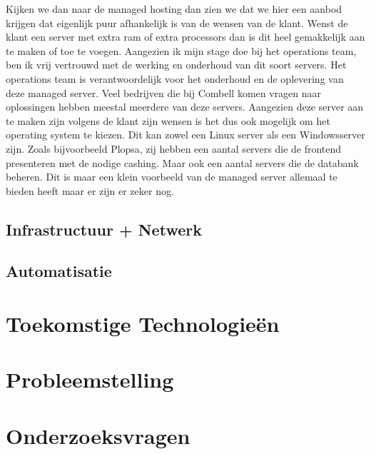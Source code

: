 Kijken we dan naar de managed hosting dan zien we dat we hier een aanbod krijgen dat eigenlijk puur afhankelijk is van de wensen van de klant. Wenst de klant een server met extra ram of extra processors dan is dit heel gemakkelijk aan te maken of toe te voegen. Aangezien ik mijn stage doe bij het operations team, ben ik vrij vertrouwd met de werking en onderhoud van dit soort servers. Het operations team is verantwoordelijk voor het onderhoud en de oplevering van deze managed server. Veel bedrijven die bij Combell komen vragen naar oplossingen hebben meestal meerdere van deze servers. Aangezien deze server aan te maken zijn volgens de klant zijn wensen is het dus ook mogelijk om het operating system te kiezen. Dit kan zowel een Linux server als een Windowsserver zijn. Zoals bijvoorbeeld Plopsa, zij hebben een aantal servers die de frontend presenteren met de nodige cashing. Maar ook een aantal servers die de databank beheren. Dit is maar een klein voorbeeld van de managed server allemaal te bieden heeft maar er zijn er zeker nog.

\subsection{Infrastructuur + Netwerk}

\subsection{Automatisatie}

\section{Toekomstige Technologieën}

\section{Probleemstelling}

\section{Onderzoeksvragen}
\label{sec:onderzoeksvragen}


